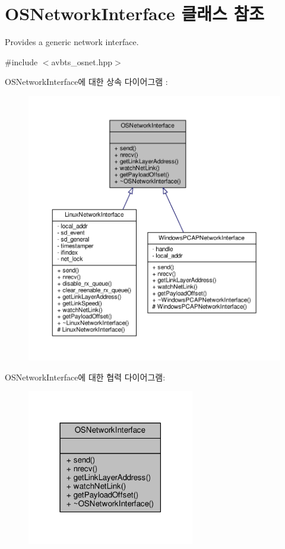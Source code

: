 \hypertarget{class_o_s_network_interface}{}\section{O\+S\+Network\+Interface 클래스 참조}
\label{class_o_s_network_interface}


Provides a generic network interface.  




{\ttfamily \#include $<$avbts\+\_\+osnet.\+hpp$>$}



O\+S\+Network\+Interface에 대한 상속 다이어그램 \+: 
\nopagebreak
\begin{figure}[H]
\begin{center}
\leavevmode
\includegraphics[width=350pt]{class_o_s_network_interface__inherit__graph}
\end{center}
\end{figure}


O\+S\+Network\+Interface에 대한 협력 다이어그램\+:
\nopagebreak
\begin{figure}[H]
\begin{center}
\leavevmode
\includegraphics[width=207pt]{class_o_s_network_interface__coll__graph}
\end{center}
\end{figure}
